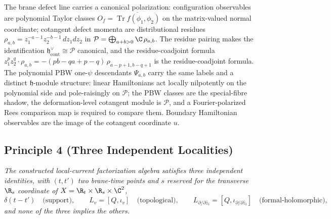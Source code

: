 The brane defect line carries a canonical polarization: configuration
observables are polynomial Taylor classes
\(O_f=\overline{\operatorname{Tr}f(\phi_1,\phi_2)}\) on the
matrix-valued normal coordinate; cotangent defect momenta are
distributional residues
\(\rho_{a,b}=z_1^{-a-1}z_2^{-b-1}\,dz_1dz_2\) in
\(\mathcal P=\bigoplus_{a+b>0}\C\,\rho_{a,b}\).  The residue pairing
makes the identification \(\mathfrak h^\vee_{\mathrm{cont}}\cong
\mathcal P\) canonical, and the residue-coadjoint formula
\(z_1^p z_2^q\cdot\rho_{a,b}=-(pb-qa+p-q)\,\rho_{a-p+1,b-q+1}\) is
the residue-coadjoint formula.  The polynomial PBW one-\(\psi\)
descendants \(\Psi_{a,b}\) carry the same labels and a distinct
\(\mathfrak h\)-module structure: linear Hamiltonians act locally
nilpotently on the polynomial side and pole-raisingly on
\(\mathcal P\); the PBW classes are the special-fibre shadow, the
deformation-level cotangent module is \(\mathcal P\), and a
Fourier-polarized Rees comparison map is required to compare them.
Boundary Hamiltonian observables are the image of the cotangent
coordinate \(u\).

\subsection*{Principle 4 (Three Independent Localities)}

\emph{The constructed local-current factorization algebra satisfies
three independent identities, with \((t,t')\) two
brane-time points and \(s\) reserved for the transverse \(\R_s\)
coordinate of \(X=\R_t\times\R_s\times\C^2\),
\[
  \delta(t-t')\quad\text{(support)},\qquad
  L_v=[Q,\iota_v]\quad\text{(topological)},\qquad
  L_{\partial/\partial\bar z_i}
   =[Q,\iota_{\partial/\partial\bar z_i}]
   \quad\text{(formal-holomorphic)},
\]
and none of the three implies the others.}

